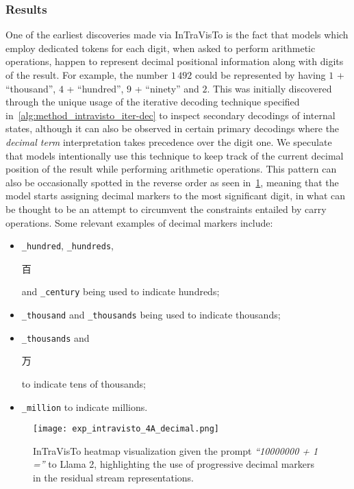 \subsubsection{Results}

One of the earliest discoveries made via InTraVisTo is the fact that models which employ dedicated tokens for each digit, when asked to perform arithmetic operations, happen to represent decimal positional information along with digits of the result.
For example, the number $1\,492$ could be represented by having $1$ + ``thousand'', $4$ + ``hundred'', $9$ + ``ninety'' and $2$.
This was initially discovered through the unique usage of the iterative decoding technique specified in~\cref{alg:method_intravisto_iter-dec} to inspect secondary decodings of internal states, although it can also be observed in certain primary decodings where the \emph{decimal term} interpretation takes precedence over the digit one.
We speculate that models intentionally use this technique to keep track of the current decimal position of the result while performing arithmetic operations.
This pattern can also be occasionally spotted in the reverse order as seen in~\cref{fig:exp_intravisto_4_A}, meaning that the model starts assigning decimal markers to the most significant digit, in what can be thought to be an attempt to circumvent the constraints entailed by carry operations.
Some relevant examples of decimal markers include:
\begin{itemize}
    \item \texttt{\_hundred}, \texttt{\_hundreds}, \begin{CJK}{UTF8}{goth}百\end{CJK} and \texttt{\_century} being used to indicate hundreds;
    \item \texttt{\_thousand} and \texttt{\_thousands} being used to indicate thousands;
    \item \texttt{\_thousands} and \begin{CJK}{UTF8}{goth}万\end{CJK} to indicate tens of thousands;
    \item \texttt{\_million} to indicate millions.
\end{itemize}

\begin{figure}[t!]
    \centering
    \texttt{[image: exp\_intravisto\_4A\_decimal.png]}
    \caption[InTraVisTo heatmap visualization given the prompt \emph{``10000000 + 1 =''} to Llama 2.]{InTraVisTo heatmap visualization given the prompt \emph{``10000000 + 1 =''} to Llama 2, highlighting the use of progressive decimal markers in the residual stream representations.}
    \label{fig:exp_intravisto_4_A}
\end{figure}

